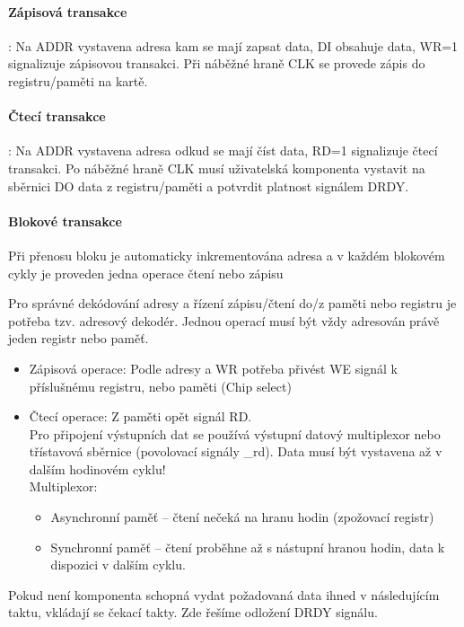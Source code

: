 \documentclass[a4paper, 11pt]{report}
\begin{document}
\paragraph{Zápisová transakce}: Na ADDR vystavena adresa kam se mají zapsat data, DI obsahuje data, WR=1 signalizuje zápisovou transakci. Při náběžné hraně CLK se provede zápis do registru/paměti na kartě.

\paragraph{Čtecí transakce}: Na ADDR vystavena adresa odkud se mají číst data, RD=1 signalizuje čtecí transakci. Po náběžné hraně CLK musí uživatelská komponenta vystavit na sběrnici DO data z registru/paměti a potvrdit platnost signálem DRDY.

\paragraph{Blokové transakce}
Při přenosu bloku je automaticky inkrementována adresa a v každém blokovém cykly je proveden jedna operace čtení nebo zápisu

Pro správné dekódování adresy a řízení zápisu/čtení do/z paměti nebo registru je potřeba tzv. adresový dekodér. Jednou operací musí být vždy adresován právě jeden registr nebo paměť.
\begin{itemize}
	\item Zápisová operace: Podle adresy a WR potřeba přivést WE signál k příslušnému registru, nebo paměti (Chip select)
	\item Čtecí operace: Z paměti opět signál RD.\\
	Pro připojení výstupních dat se používá výstupní datový multiplexor nebo třístavová sběrnice (povolovací signály \_rd). Data musí být vystavena až v dalším hodinovém cyklu!\\
	Multiplexor: 
	\begin{itemize}
		\item Asynchronní paměť -- čtení nečeká na hranu hodin (zpožovací registr)
		\item Synchronní paměť -- čtení proběhne až s nástupní hranou hodin, data k dispozici v dalším cyklu.
	\end{itemize}
\end{itemize}

Pokud není komponenta schopná vydat požadovaná data ihned v následujícím taktu, vkládají se čekací takty. Zde řešíme odložení DRDY signálu.
\end{document}
